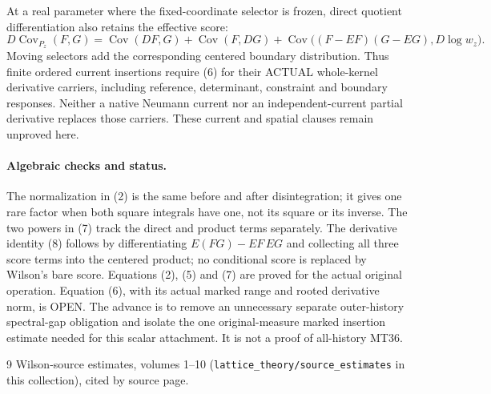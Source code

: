 \documentclass[11pt]{article}
\newcommand{\Cov}{\operatorname{Cov}}
\begin{document}
At a real parameter where the fixed-coordinate selector is frozen, direct
quotient differentiation also retains the effective score:
\[
 D\Cov_{P_z}(F,G)=\Cov(DF,G)+\Cov(F,DG)
 +\Cov\big((F-EF)(G-EG),D\log w_z\big).                \tag{8}
\]
Moving selectors add the corresponding centered boundary distribution. Thus finite
ordered current insertions require (6) for their ACTUAL whole-kernel derivative
carriers, including reference, determinant, constraint and boundary responses.
Neither a native Neumann current nor an independent-current partial derivative
replaces those carriers. These current and spatial clauses remain unproved here.

\paragraph{Algebraic checks and status.}
The normalization in (2) is the same before and after disintegration; it gives
one rare factor when both square integrals have one, not its square or its inverse.
The two powers in (7) track the direct and product terms separately. The derivative
identity (8) follows by differentiating $E(FG)-EF\,EG$ and collecting all three
score terms into the centered product; no conditional score is replaced by Wilson's
bare score. Equations (2), (5) and (7) are proved for the actual original operation.
Equation (6), with its actual marked range and rooted derivative norm, is OPEN.
The advance is to remove an unnecessary separate outer-history spectral-gap
obligation and isolate the one original-measure marked insertion estimate needed
for this scalar attachment. It is not a proof of all-history MT36.
\begin{thebibliography}{9}
 Wilson-source estimates, volumes 1--10 (\texttt{lattice\_theory/source\_estimates} in this collection), cited by source page.
\end{thebibliography}
\end{document}
